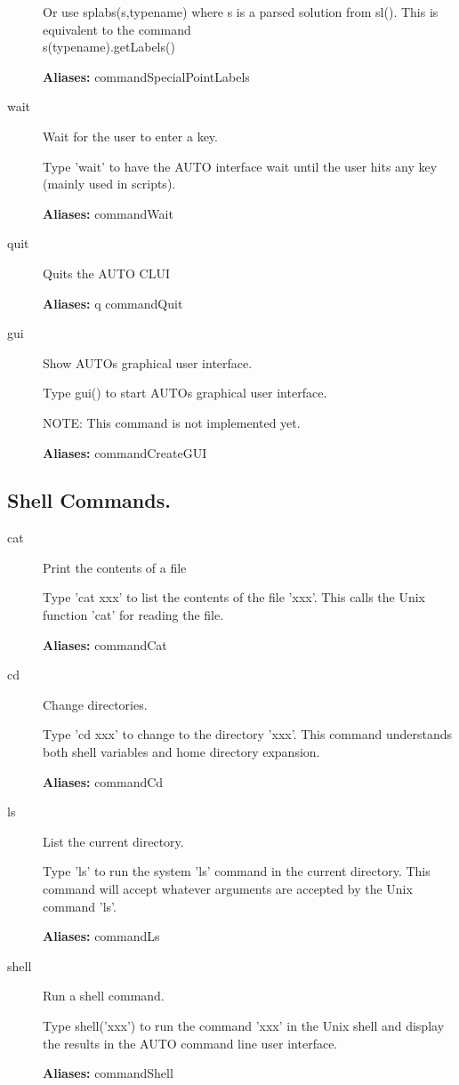 \documentclass[12pt]{report}
\begin{document}
\begin{description}
    Or use splabs(s,typename) where s is a parsed solution from sl().
    This is equivalent to the command\\
    s(typename).getLabels()

\textbf{Aliases:} commandSpecialPointLabels

\item[wait]
Wait for the user to enter a key.

    Type 'wait' to have the AUTO interface wait
    until the user hits any key (mainly used in scripts).

\textbf{Aliases:} commandWait

\item[quit]
Quits the AUTO CLUI

\textbf{Aliases:} q commandQuit

\item[gui]
Show AUTOs graphical user interface.

    Type gui() to start AUTOs graphical user interface.
    
    NOTE: This command is not implemented yet.
    
\textbf{Aliases:} commandCreateGUI

\end{description}

\subsection{Shell Commands.} \label{sec:clui_ref_shell}

\begin{description}
\item[cat]
Print the contents of a file

    Type 'cat xxx' to list the contents of the file 'xxx'.  This calls the
    Unix function 'cat' for reading the file.  
    
\textbf{Aliases:} commandCat

\item[cd]
Change directories.
    
    Type 'cd xxx' to change to the directory 'xxx'.  This command
    understands both shell variables and home directory expansion.
    
\textbf{Aliases:} commandCd 

\item[ls]
List the current directory.
    
    Type 'ls' to run the system 'ls' command in the current directory.  This
    command will accept whatever arguments are accepted by the Unix command
    'ls'.
    
\textbf{Aliases:} commandLs

\item[shell]
Run a shell command.
        
    Type shell('xxx') to run the command 'xxx' in the Unix shell and display
    the results in the AUTO command line user interface.
    
\textbf{Aliases:} commandShell
\end{description}
\end{document}
